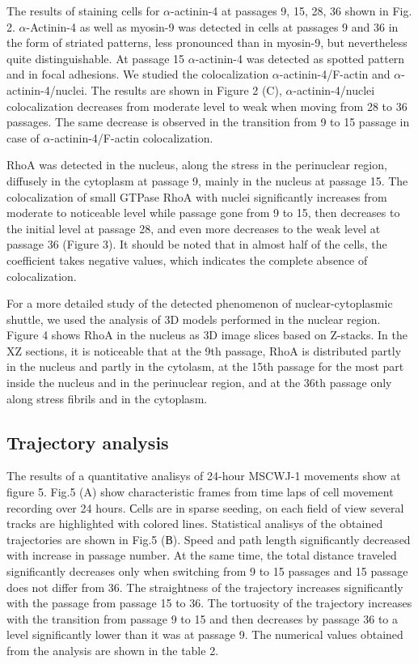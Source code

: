 \documentclass[alpha-refs]{wiley-article}
\begin{document}
The results of staining cells for $\alpha$-actinin-4 at passages 9, 15, 28, 36 shown in Fig. 2.
$\alpha$-Actinin-4 as well as myosin-9 was detected in cells at passages 9 and 36 in the form of striated patterns, less pronounced than in myosin-9, but nevertheless quite distinguishable.
At passage 15 $\alpha$-actinin-4 was detected as spotted pattern and in focal adhesions.
We studied the colocalization $\alpha$-actinin-4/F-actin and $\alpha$-actinin-4/nuclei.
The results are shown in Figure 2 (C), $\alpha$-actinin-4/nuclei colocalization decreases from moderate level to weak when moving from 28 to 36 passages.
The same decrease is observed in the transition from 9 to 15 passage in case of $\alpha$-actinin-4/F-actin colocalization.

RhoA was detected in the nucleus, along the stress in the perinuclear region, diffusely in the cytoplasm at passage 9, mainly in the nucleus at passage 15.
The colocalization of small GTPase RhoA with nuclei significantly increases from moderate to noticeable level while passage gone from 9 to 15, then decreases to the initial level at passage 28, and even more decreases to the weak level at passage 36 (Figure 3).
It should be noted that in almost half of the cells, the coefficient takes negative values, which indicates the complete absence of colocalization.

For a more detailed study of the detected phenomenon of nuclear-cytoplasmic shuttle, we used the analysis of 3D models performed in the nuclear region.
Figure 4 shows RhoA in the nucleus as 3D image slices based on Z-stacks.
In the XZ sections, it is noticeable that at the 9th passage, RhoA is distributed partly in the nucleus and partly in the cytolasm, at the 15th passage for the most part inside the nucleus and in the perinuclear region, and at the 36th passage only along stress fibrils and in the cytoplasm.

\subsection{Trajectory analysis}

The results of a quantitative analisys of 24-hour MSCWJ-1 movements show at figure 5.
Fig.5 (A) show characteristic frames from time laps of cell movement recording over 24 hours.
Сells are in sparse seeding, on each field of view several tracks are highlighted with colored lines.
Statistical analisys of the obtained trajectories are shown in Fig.5 (В).
Speed and path length significantly decreased with increase in passage number.
At the same time, the total distance traveled significantly decreases only when switching from 9 to 15 passages and 15 passage does not differ from 36.
The straightness of the trajectory increases significantly with the passage from passage 15 to 36.
The tortuosity of the trajectory increases with the transition from passage 9 to 15 and then decreases by passage 36 to a level significantly lower than it was at passage 9.
The numerical values obtained from the analysis are shown in the table 2.
\end{document}

